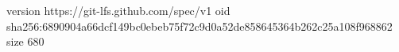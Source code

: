 version https://git-lfs.github.com/spec/v1
oid sha256:6890904a66dcf149bc0ebeb75f72c9d0a52de858645364b262c25a108f968862
size 680

